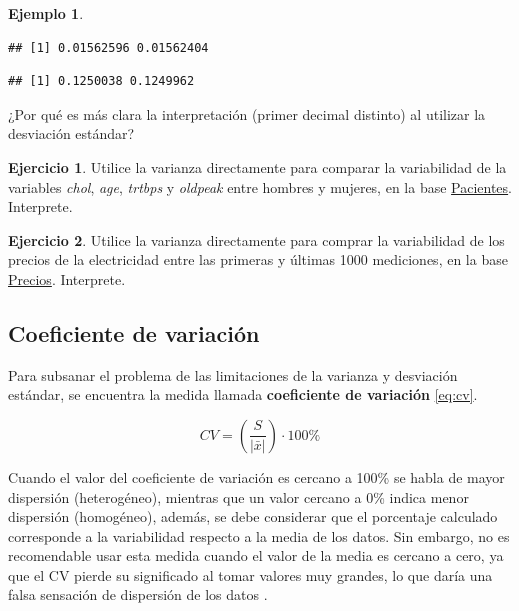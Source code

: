 \documentclass[
  11pt,
]{book}
\newenvironment{Shaded}{\begin{snugshade}}{\end{snugshade}}
\newcommand{\FunctionTok}[1]{\textcolor[rgb]{0.13,0.29,0.53}{\textbf{#1}}}
\newcommand{\NormalTok}[1]{#1}
\newcommand{\SpecialCharTok}[1]{\textcolor[rgb]{0.81,0.36,0.00}{\textbf{#1}}}
\theoremstyle{definition}
\theoremstyle{definition}
\newtheorem{example}{Ejemplo}[chapter]
\theoremstyle{definition}
\newtheorem{exercise}{Ejercicio}[chapter]
\theoremstyle{definition}
\theoremstyle{remark}
\begin{document}
\begin{example}
\begin{enumerate}
\begin{verbatim}
## [1] 0.01562596 0.01562404
\end{verbatim}

\begin{Shaded}
\end{Shaded}

\begin{verbatim}
## [1] 0.1250038 0.1249962
\end{verbatim}

  ¿Por qué es más clara la interpretación (primer decimal distinto) al utilizar la desviación estándar?
\end{enumerate}

\end{example}

\begin{exercise}
Utilice la varianza directamente para comparar la variabilidad de la variables \emph{chol}, \emph{age}, \emph{trtbps} y \emph{oldpeak} entre hombres y mujeres, en la base \hyperref[Pacientes]{Pacientes}. Interprete.
\end{exercise}

\begin{exercise}
Utilice la varianza directamente para comprar la variabilidad de los precios de la electricidad entre las primeras y últimas 1000 mediciones, en la base \hyperref[PreciosElectricidad]{Precios}. Interprete.
\end{exercise}

\subsection{Coeficiente de variación}\label{coeficiente-de-variaciuxf3n}

Para subsanar el problema de las limitaciones de la varianza y desviación estándar, se encuentra la medida llamada \textbf{coeficiente de variación} \eqref{eq:cv}.

\begin{equation}
CV = \left(\frac{S}{|\bar{x}|}\right)\cdot 100\%
\label{eq:cv}
\end{equation}

Cuando el valor del coeficiente de variación es cercano a 100\% se habla de mayor dispersión (heterogéneo), mientras que un valor cercano a 0\% indica menor dispersión (homogéneo), además, se debe considerar que el porcentaje calculado corresponde a la variabilidad respecto a la media de los datos. Sin embargo, no es recomendable usar esta medida cuando el valor de la media es cercano a cero, ya que el CV pierde su significado al tomar valores muy grandes, lo que daría una falsa sensación de dispersión de los datos \citep[página 95]{anderson}.
\end{document}
